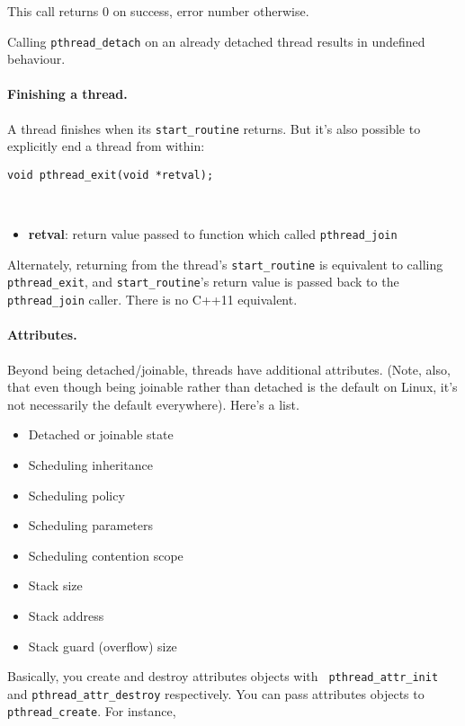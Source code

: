 This call returns 0 on success, error number otherwise.

Calling {\tt pthread\_detach} on an already detached thread results in undefined
behaviour.

\paragraph{Finishing a thread.} A thread finishes when its {\tt start\_routine}
returns. But it's also possible to explicitly end a thread from within:

\begin{verbatim}
void pthread_exit(void *retval);
\end{verbatim}
~\vspace*{-3em}
\begin{itemize}
\item  {\bf retval}: return value passed to function which called {\tt pthread\_join}
\end{itemize}

Alternately, returning from the thread's {\tt start\_routine} is equivalent
to calling {\tt pthread\_exit}, and {\tt start\_routine}'s return value
is passed back to the {\tt pthread\_join} caller. There is no C++11 equivalent.

\paragraph{Attributes.} Beyond being detached/joinable, threads have additional
attributes. (Note, also, that even though being joinable rather than
detached is the default on Linux, it's not necessarily the default everywhere).
Here's a list.
  \begin{itemize}
    \item Detached or joinable state
    \item Scheduling inheritance
    \item Scheduling policy
    \item Scheduling parameters
    \item Scheduling contention scope
    \item Stack size
    \item Stack address
    \item Stack guard (overflow) size
  \end{itemize}

Basically, you create and destroy attributes objects with {\tt
  pthread\_attr\_init} and {\tt pthread\_attr\_destroy}
respectively. You can pass attributes objects to {\tt
  pthread\_create}. For instance,

